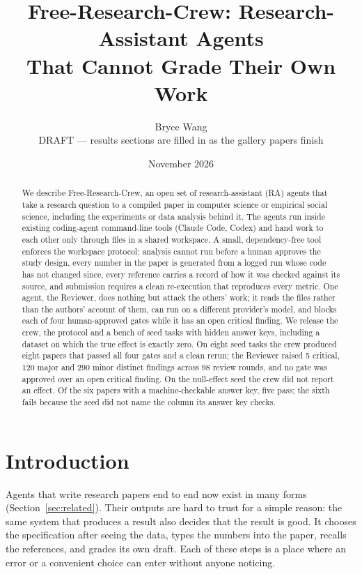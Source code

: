 \documentclass[11pt]{article}
\title{Free-Research-Crew: Research-Assistant Agents\\That Cannot Grade Their Own Work}
\author{Bryce Wang\\ \small DRAFT --- results sections are filled in as the gallery papers finish}
\date{November 2026}
\begin{document}
\maketitle

\begin{abstract}
We describe Free-Research-Crew, an open set of research-assistant (RA) agents that take a
research question to a compiled paper in computer science or empirical social science,
including the experiments or data analysis behind it. The agents run inside existing
coding-agent command-line tools (Claude Code, Codex) and hand work to each other only
through files in a shared workspace. A small, dependency-free tool enforces the
workspace protocol: analysis cannot run before a human approves the study design, every
number in the paper is generated from a logged run whose code has not changed since,
every reference carries a record of how it was checked against its source, and
submission requires a clean re-execution that reproduces every metric. One agent, the
Reviewer, does nothing but attack the others' work; it reads the files rather than the
authors' account of them, can run on a different provider's model, and blocks each of
four human-approved gates while it has an open critical finding. We release the crew,
the protocol and a bench of seed tasks with hidden answer keys, including a dataset on
which the true effect is exactly zero. On eight seed tasks the crew produced eight papers
that passed all four gates and a clean rerun; the Reviewer raised 5 critical, 120 major
and 290 minor distinct findings across 98 review rounds, and no gate was approved over an
open critical finding. On the null-effect seed the crew did not report an effect. Of the
six papers with a machine-checkable answer key, five pass; the sixth fails because the
seed did not name the column its answer key checks.
\end{abstract}

\section{Introduction}

Agents that write research papers end to end now exist in many forms
(Section~\ref{sec:related}). Their outputs are hard to trust for a simple reason: the
same system that produces a result also decides that the result is good. It chooses
the specification after seeing the data, types the numbers into the paper, recalls the
references, and grades its own draft. Each of these steps is a place where an error or
a convenient choice can enter without anyone noticing.
\end{document}
